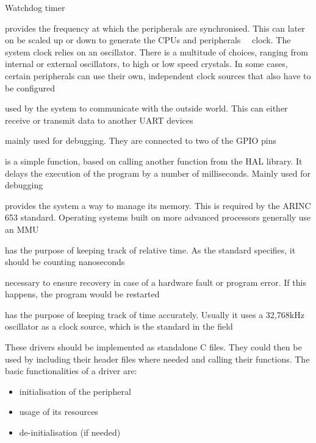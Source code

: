 \begin{labeling}{Watchdog timer}
	\item [\textbf{System Clock}] provides the frequency at which the
	peripherals are synchronised. This can later on be scaled up or down
	to generate the CPU\textquotesingle s and peripherals\textquotesingle
	\ \ clock.
	The system clock relies on an oscillator.
	There is a multitude of choices, ranging from internal or external
	oscillators, to high or low speed crystals. In some cases, certain
	peripherals can use their own, independent clock sources that also have
	to be configured
	\item [\textbf{UART}] used by the system to communicate with the outside
	world. This can either receive or transmit data to another UART devices
	\item [\textbf{LEDs}] mainly used for debugging. They are
	connected to two of the GPIO pins
	\item [\textbf{Delay}] is a simple function, based on calling another
	function from the HAL library. It delays the execution
	of the program by a number of milliseconds. Mainly used for debugging
	\item [\textbf{MPU}] provides the system a way to manage its
	memory. This is required by the ARINC 653 standard.
	Operating systems built on more advanced processors generally use
	an MMU
	\item [\textbf{Timing}] has the purpose of keeping track of
	relative time. As the standard specifies, it should be counting
	nanoseconds
	\item [\textbf{Watchdog timer}] necessary to ensure recovery
	in case of a hardware fault or program error. If this happens, the
	program would be restarted
	\item [\textbf{RTC}] has the purpose of keeping track of
	time accurately. Usually it uses  a 32,768kHz oscillator as a
	clock source, which is the standard in the field
\end{labeling}

These drivers should be implemented as standalone C files. They could then
be used by including their header files where needed and calling their
functions.
The basic functionalities of a driver are:
\begin{itemize}[noitemsep]
	\item initialisation of the peripheral
	\item usage of its resources
	\item de-initialisation (if needed)
\end{itemize}


